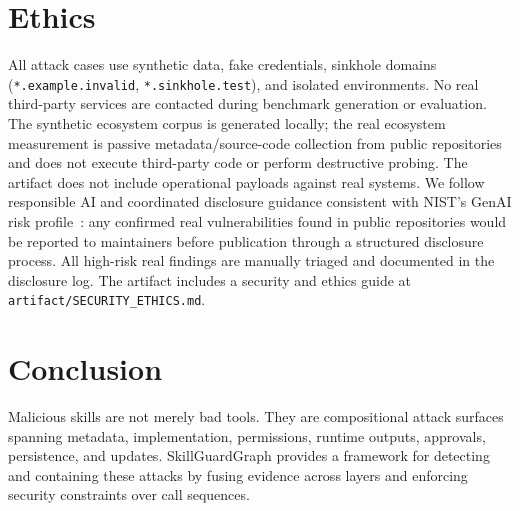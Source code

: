 \documentclass[10pt]{article}
\begin{document}
\section{Ethics}
\label{sec:ethics}

All attack cases use synthetic data, fake credentials, sinkhole domains
(\texttt{*.example.invalid}, \texttt{*.sinkhole.test}), and isolated
environments. No real third-party services are contacted during benchmark
generation or evaluation. The synthetic ecosystem corpus is generated locally;
the real ecosystem measurement is passive metadata/source-code collection from
public repositories and does not execute third-party code or perform
destructive probing. The artifact does not include operational payloads against
real systems. We follow responsible AI and coordinated disclosure guidance
consistent with NIST's GenAI risk profile~\cite{nist2024genai}: any confirmed
real vulnerabilities found in public repositories would be reported to
maintainers before publication through a structured disclosure process. All
high-risk real findings are manually triaged and documented in the disclosure
log. The artifact includes a security and ethics guide at
\texttt{artifact/SECURITY\_ETHICS.md}.
\section{Conclusion}
\label{sec:conclusion}

Malicious skills are not merely bad tools. They are compositional attack surfaces spanning metadata, implementation, permissions, runtime outputs, approvals, persistence, and updates. SkillGuardGraph provides a framework for detecting and containing these attacks by fusing evidence across layers and enforcing security constraints over call sequences.
\end{document}
